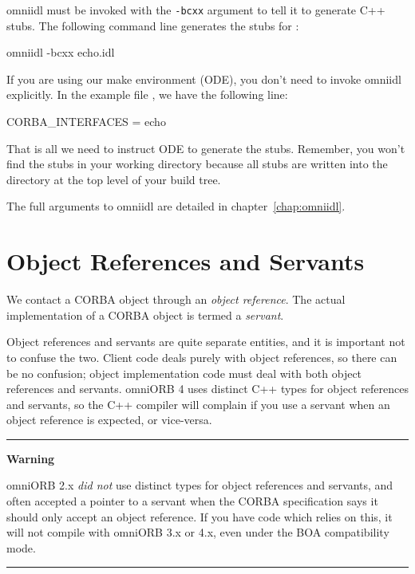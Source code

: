 \documentclass[11pt,twoside,a4paper]{book}
\newcommand{\cmdline}[1]{\texttt{#1}}
\newcommand{\term}[1]{\textit{#1}}
\newenvironment{statement}%
 {\noindent\begin{minipage}{\textwidth}%
  \vspace{.5\baselineskip}%
  \noindent\rule{\textwidth}{2pt}%
  \vspace{.25\baselineskip}%
  \begin{list}{}{\setlength{\listparindent}{0em}%
                 \setlength{\itemindent}{0em}%
                 \setlength{\leftmargin}{1.5em}%
                 \setlength{\rightmargin}{\leftmargin}%
                 \setlength{\topsep}{0pt}%
                 \setlength{\partopsep}{0pt}}
  \item\relax}
 {\end{list}%
  \vspace{-.25\baselineskip}%
  \noindent\rule{\textwidth}{2pt}%
  \vspace{.5\baselineskip}%
  \end{minipage}}
\newcommand{\file}{\begingroup \urlstyle{tt}\Url}
\begin{document}
\noindent omniidl must be invoked with the \cmdline{-bcxx} argument to
tell it to generate C++ stubs. The following command line generates
the stubs for \file{echo.idl}:

\begin{makelisting}
omniidl -bcxx echo.idl
\end{makelisting}

\noindent If you are using our make environment (ODE), you don't need
to invoke omniidl explicitly. In the example file \file{dir.mk}, we
have the following line:

\begin{makelisting}
CORBA_INTERFACES = echo
\end{makelisting}

\noindent That is all we need to instruct ODE to generate the stubs.
Remember, you won't find the stubs in your working directory because
all stubs are written into the \file{stub} directory at the top level
of your build tree.

The full arguments to omniidl are detailed in
chapter~\ref{chap:omniidl}.


\section{Object References and Servants}

We contact a CORBA object through an \term{object reference}. The
actual implementation of a CORBA object is termed a \term{servant}.

Object references and servants are quite separate entities, and it is
important not to confuse the two. Client code deals purely with object
references, so there can be no confusion; object implementation code
must deal with both object references and servants. omniORB 4 uses
distinct C++ types for object references and servants, so the C++
compiler will complain if you use a servant when an object reference
is expected, or vice-versa.

\begin{statement}
\centerline{\textbf{Warning}}

omniORB 2.x \emph{did not} use distinct types for object references
and servants, and often accepted a pointer to a servant when the CORBA
specification says it should only accept an object reference. If you
have code which relies on this, it will not compile with omniORB 3.x
or 4.x, even under the BOA compatibility mode.
\end{statement}
\end{document}
